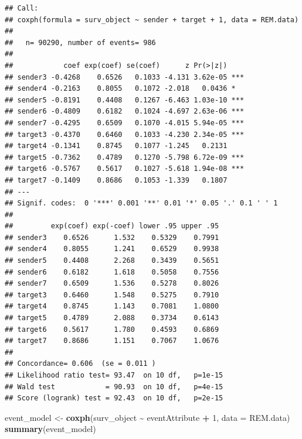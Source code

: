 \documentclass[
]{article}
\newenvironment{Shaded}{\begin{snugshade}}{\end{snugshade}}
\newcommand{\AttributeTok}[1]{\textcolor[rgb]{0.13,0.29,0.53}{#1}}
\newcommand{\DecValTok}[1]{\textcolor[rgb]{0.00,0.00,0.81}{#1}}
\newcommand{\FunctionTok}[1]{\textcolor[rgb]{0.13,0.29,0.53}{\textbf{#1}}}
\newcommand{\NormalTok}[1]{#1}
\newcommand{\OtherTok}[1]{\textcolor[rgb]{0.56,0.35,0.01}{#1}}
\newcommand{\SpecialCharTok}[1]{\textcolor[rgb]{0.81,0.36,0.00}{\textbf{#1}}}
\begin{document}
\begin{verbatim}
## Call:
## coxph(formula = surv_object ~ sender + target + 1, data = REM.data)
## 
##   n= 90290, number of events= 986 
## 
##            coef exp(coef) se(coef)      z Pr(>|z|)    
## sender3 -0.4268    0.6526   0.1033 -4.131 3.62e-05 ***
## sender4 -0.2163    0.8055   0.1072 -2.018   0.0436 *  
## sender5 -0.8191    0.4408   0.1267 -6.463 1.03e-10 ***
## sender6 -0.4809    0.6182   0.1024 -4.697 2.63e-06 ***
## sender7 -0.4295    0.6509   0.1070 -4.015 5.94e-05 ***
## target3 -0.4370    0.6460   0.1033 -4.230 2.34e-05 ***
## target4 -0.1341    0.8745   0.1077 -1.245   0.2131    
## target5 -0.7362    0.4789   0.1270 -5.798 6.72e-09 ***
## target6 -0.5767    0.5617   0.1027 -5.618 1.94e-08 ***
## target7 -0.1409    0.8686   0.1053 -1.339   0.1807    
## ---
## Signif. codes:  0 '***' 0.001 '**' 0.01 '*' 0.05 '.' 0.1 ' ' 1
## 
##         exp(coef) exp(-coef) lower .95 upper .95
## sender3    0.6526      1.532    0.5329    0.7991
## sender4    0.8055      1.241    0.6529    0.9938
## sender5    0.4408      2.268    0.3439    0.5651
## sender6    0.6182      1.618    0.5058    0.7556
## sender7    0.6509      1.536    0.5278    0.8026
## target3    0.6460      1.548    0.5275    0.7910
## target4    0.8745      1.143    0.7081    1.0800
## target5    0.4789      2.088    0.3734    0.6143
## target6    0.5617      1.780    0.4593    0.6869
## target7    0.8686      1.151    0.7067    1.0676
## 
## Concordance= 0.606  (se = 0.011 )
## Likelihood ratio test= 93.47  on 10 df,   p=1e-15
## Wald test            = 90.93  on 10 df,   p=4e-15
## Score (logrank) test = 92.43  on 10 df,   p=2e-15
\end{verbatim}

\begin{Shaded}
\begin{Highlighting}[]
\NormalTok{event\_model }\OtherTok{\textless{}{-}} \FunctionTok{coxph}\NormalTok{(surv\_object }\SpecialCharTok{\textasciitilde{}}\NormalTok{ eventAttribute }\SpecialCharTok{+} \DecValTok{1}\NormalTok{, }\AttributeTok{data =}\NormalTok{ REM.data)}
\FunctionTok{summary}\NormalTok{(event\_model)}
\end{Highlighting}
\end{Shaded}
\end{document}
